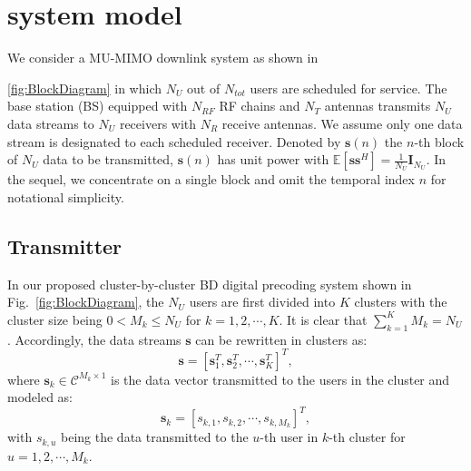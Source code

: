 \documentclass[conference]{IEEEtran}
\begin{document}
\section{system model}
We consider a MU-MIMO downlink system as shown in \figurename{\ref{fig:BlockDiagram} in which $N_U$ out of $N_{tot}$ users are scheduled for service. The base station (BS) equipped with $N_{RF}$ RF chains and $N_T$ antennas transmits $N_U$ data streams to $N_U$ receivers with $N_R$ receive antennas. We assume only one data stream is designated to each scheduled receiver. Denoted by ${\bm s}(n)$ the $n$-th block of $N_U$ data to be transmitted, ${\bm s}(n)$ has unit power with $\mathbb{E}\left[\bm{ss}^H\right]=\frac{1}{N_U}\bm{I}_{N_U}$. In the sequel, we concentrate on a single block and omit the temporal index $n$ for notational simplicity.

\subsection{Transmitter}
In our proposed cluster-by-cluster BD digital precoding system shown in Fig.~\ref{fig:BlockDiagram}, the $N_U$ users are first divided into $K$ clusters with the cluster size being $0< M_k\leq N_U$ for $k=1,2,\cdots,K$. It is clear that $\displaystyle\sum_{k=1}^{K} M_k = N_U$. Accordingly, the data streams $\bm{s}$ can be rewritten in clusters as:
\begin{equation}
\bm{s} = \left[{\mathbf{s}}_1^T, {\mathbf{s}}_2^T,\cdots, \mathbf{s}_{K}^T\right]^T,
\end{equation}
where $\mathbf{s}_k\in \mathcal{C}^{M_k\times 1}$ is the data vector transmitted to the users in the  cluster and modeled as:
\begin{equation}
\mathbf{s}_k = \left[s_{k,1}, s_{k,2},\cdots, s_{k,M_k}\right]^T,
\end{equation}
with $s_{k,u}$ being the data transmitted to the $u$-th user in $k$-th cluster for $u=1,2,\cdots,M_k$.

}
\end{document}
